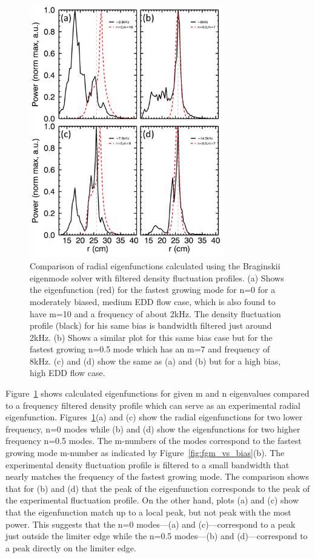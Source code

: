 \documentclass[aip,pop,amsmath,amssymb,reprint,superscriptaddress]{revtex4-1} %
\begin{document}
\begin{figure}[!htbp]
\centerline{
\includegraphics[width=8.5cm]{eigfunc_comp}}%
\caption{\label{fig:eigfunc_comp} Comparison of radial eigenfunctions calculated using the Braginskii eigenmode solver with filtered density fluctuation profiles. (a) Shows the eigenfunction (red) for the fastest growing mode for n=0 for a moderately biased, medium EDD flow case, which is also found to have m=10 and a frequency of about 2kHz. The density fluctuation profile (black) for his same bias is bandwidth filtered just around 2kHz. (b) Shows a similar plot for this same bias case but for the fastest growing n=0.5 mode which has an m=7 and frequency of 8kHz. (c) and (d) show the same as (a) and (b) but for a high bias, high EDD flow case.}
\end{figure}

Figure~\ref{fig:eigfunc_comp} shows calculated eigenfunctions for given m and n eigenvalues compared to a frequency filtered density profile which can serve as an experimental radial eigenfunction. Figures~\ref{fig:eigfunc_comp}(a) and (c) show the radial eigenfunctions for two lower frequency, n=0 modes while (b) and (d) show the eigenfunctions for two higher frequency n=0.5 modes. The m-numbers of the modes correspond to the fastest growing mode m-number as indicated by Figure~\ref{fig:fgm_vs_bias}(b). The experimental density fluctuation profile is filtered to a small bandwidth that nearly matches the frequency of the fastest growing mode. The comparison shows that for (b) and (d) that the peak of the eigenfunction corresponds to the peak of the experimental fluctuation profile. On the other hand, plots (a) and (c) show that the eigenfunction match up to a local peak, but not peak with the most power. This suggests that the n=0 modes---(a) and (c)---correspond to a peak just outside the limiter edge while the n=0.5 modes---(b) and (d)---correspond to a peak directly on the limiter edge.
 
\end{document}
